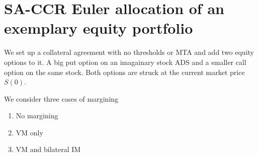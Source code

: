     

    
    \hypertarget{sa-ccr-euler-allocation-of-an-exemplary-equity-portfolio}{%
\section{SA-CCR Euler allocation of an exemplary equity
portfolio}\label{sa-ccr-euler-allocation-of-an-exemplary-equity-portfolio}}

We set up a collateral agreement with no thresholds or MTA and add two
equity options to it. A big put option on an imagainary stock ADS and a
smaller call option on the same stock. Both options are struck at the
current market price \(S(0)\).

We consider three cases of margining

\begin{enumerate}
\def\labelenumi{\arabic{enumi}.}
\tightlist
\item
  No margining
\item
  VM only
\item
  VM and bilateral IM
\end{enumerate}

